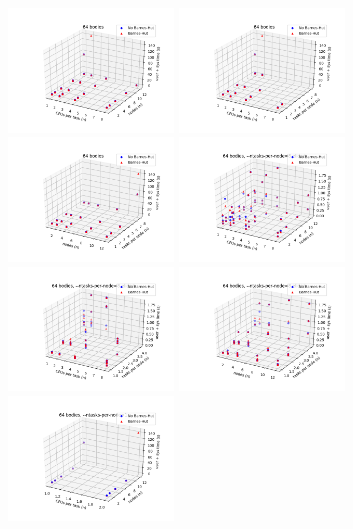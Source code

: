 \documentclass[11pt,a4paper]{article}
\begin{document}
\includegraphics[width=4.4cm]{64-cpusPerTask-nodes}
\includegraphics[width=4.4cm]{64-cpusPerTask-tasksPerNode}
\includegraphics[width=4.4cm]{64-nodes-tasksPerNode}
\includegraphics[width=4.4cm]{64-cpusPerTask-nodes-elide_8_tpn}
\includegraphics[width=4.4cm]{64-cpusPerTask-tasksPerNode-elide_8_tpn}
\includegraphics[width=4.4cm]{64-nodes-tasksPerNode-elide_8_tpn}
\includegraphics[width=4.4cm]{64-cpusPerTask-nodes-just_1_tpn}
\end{document}
